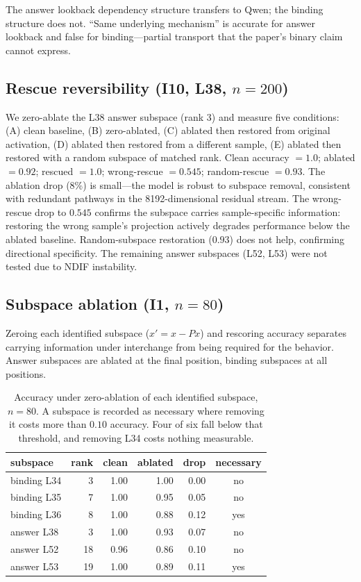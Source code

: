 \documentclass{article}
\begin{document}
The answer lookback dependency structure transfers to Qwen; the binding structure does not. ``Same underlying mechanism'' is accurate for answer lookback and false for binding---partial transport that the paper's binary claim cannot express.

\subsection{Rescue reversibility (I10, L38, $n = 200$)}

We zero-ablate the L38 answer subspace (rank 3) and measure five conditions: (A) clean baseline, (B) zero-ablated, (C) ablated then restored from original activation, (D) ablated then restored from a different sample, (E) ablated then restored with a random subspace of matched rank. Clean accuracy $= 1.0$; ablated $= 0.92$; rescued $= 1.0$; wrong-rescue $= 0.545$; random-rescue $= 0.93$. The ablation drop (8\%) is small---the model is robust to subspace removal, consistent with redundant pathways in the 8192-dimensional residual stream. The wrong-rescue drop to $0.545$ confirms the subspace carries sample-specific information: restoring the wrong sample's projection actively degrades performance below the ablated baseline. Random-subspace restoration ($0.93$) does not help, confirming directional specificity. The remaining answer subspaces (L52, L53) were not tested due to NDIF instability.

\subsection{Subspace ablation (I1, $n = 80$)}
\label{sec:ablation}

Zeroing each identified subspace ($x' = x - Px$) and rescoring accuracy separates carrying
information under interchange from being required for the behavior. Answer subspaces are
ablated at the final position, binding subspaces at all positions.

\begin{table}[h]
\centering
\small
\begin{tabular}{lrrrrc}
\toprule
subspace & rank & clean & ablated & drop & necessary \\
\midrule
binding L34 & 3 & 1.00 & 1.00 & 0.00 & no \\
binding L35 & 7 & 1.00 & 0.95 & 0.05 & no \\
binding L36 & 8 & 1.00 & 0.88 & 0.12 & yes \\
answer L38 & 3 & 1.00 & 0.93 & 0.07 & no \\
answer L52 & 18 & 0.96 & 0.86 & 0.10 & no \\
answer L53 & 19 & 1.00 & 0.89 & 0.11 & yes \\
\bottomrule
\end{tabular}
\caption{Accuracy under zero-ablation of each identified subspace, $n = 80$. A subspace is
recorded as necessary where removing it costs more than $0.10$ accuracy. Four of six fall
below that threshold, and removing L34 costs nothing measurable.}
\label{tab:ablation}
\end{table}
\end{document}
